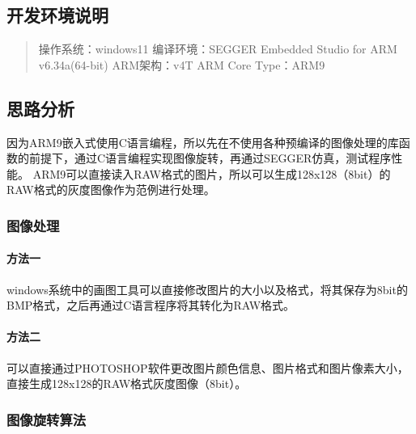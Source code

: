\documentclass[
]{article}
\author{}
\date{}
\begin{document}
\hypertarget{ux5f00ux53d1ux73afux5883ux8bf4ux660e}{%
\subsection{开发环境说明}\label{ux5f00ux53d1ux73afux5883ux8bf4ux660e}}

\begin{quote}
操作系统：windows11 编译环境：SEGGER Embedded Studio for ARM
v6.34a(64-bit) ARM架构：v4T ARM Core Type：ARM9
\end{quote}

\hypertarget{ux601dux8defux5206ux6790}{%
\subsection{思路分析}\label{ux601dux8defux5206ux6790}}

因为ARM9嵌入式使用C语言编程，所以先在不使用各种预编译的图像处理的库函数的前提下，通过C语言编程实现图像旋转，再通过SEGGER仿真，测试程序性能。
ARM9可以直接读入RAW格式的图片，所以可以生成128x128（8bit）的RAW格式的灰度图像作为范例进行处理。

\hypertarget{ux56feux50cfux5904ux7406}{%
\subsubsection{图像处理}\label{ux56feux50cfux5904ux7406}}

\hypertarget{ux65b9ux6cd5ux4e00}{%
\paragraph{方法一}\label{ux65b9ux6cd5ux4e00}}

windows系统中的画图工具可以直接修改图片的大小以及格式，将其保存为8bit的BMP格式，之后再通过C语言程序将其转化为RAW格式。

\hypertarget{ux65b9ux6cd5ux4e8c}{%
\paragraph{方法二}\label{ux65b9ux6cd5ux4e8c}}

可以直接通过PHOTOSHOP软件更改图片颜色信息、图片格式和图片像素大小，直接生成128x128的RAW格式灰度图像（8bit）。

\hypertarget{ux56feux50cfux65cbux8f6cux7b97ux6cd5}{%
\subsubsection{图像旋转算法}\label{ux56feux50cfux65cbux8f6cux7b97ux6cd5}}
\end{document}
